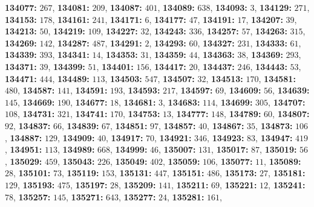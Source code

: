 \textsf{\bfseries 134077:} $267$, \textsf{\bfseries 134081:} $209$, \textsf{\bfseries 134087:} $401$, \textsf{\bfseries 134089:} $638$, \textsf{\bfseries 134093:} $3$, \textsf{\bfseries 134129:} $271$, \textsf{\bfseries 134153:} $178$, \textsf{\bfseries 134161:} $241$, \textsf{\bfseries 134171:} $6$, \textsf{\bfseries 134177:} $47$, \textsf{\bfseries 134191:} $17$, \textsf{\bfseries 134207:} $39$, \textsf{\bfseries 134213:} $50$, \textsf{\bfseries 134219:} $109$, \textsf{\bfseries 134227:} $32$, \textsf{\bfseries 134243:} $336$, \textsf{\bfseries 134257:} $57$, \textsf{\bfseries 134263:} $315$, \textsf{\bfseries 134269:} $142$, \textsf{\bfseries 134287:} $487$, \textsf{\bfseries 134291:} $2$, \textsf{\bfseries 134293:} $60$, \textsf{\bfseries 134327:} $231$, \textsf{\bfseries 134333:} $61$, \textsf{\bfseries 134339:} $393$, \textsf{\bfseries 134341:} $14$, \textsf{\bfseries 134353:} $31$, \textsf{\bfseries 134359:} $44$, \textsf{\bfseries 134363:} $38$, \textsf{\bfseries 134369:} $293$, \textsf{\bfseries 134371:} $39$, \textsf{\bfseries 134399:} $51$, \textsf{\bfseries 134401:} $156$, \textsf{\bfseries 134417:} $20$, \textsf{\bfseries 134437:} $246$, \textsf{\bfseries 134443:} $53$, \textsf{\bfseries 134471:} $444$, \textsf{\bfseries 134489:} $113$, \textsf{\bfseries 134503:} $547$, \textsf{\bfseries 134507:} $32$, \textsf{\bfseries 134513:} $170$, \textsf{\bfseries 134581:} $480$, \textsf{\bfseries 134587:} $141$, \textsf{\bfseries 134591:} $193$, \textsf{\bfseries 134593:} $217$, \textsf{\bfseries 134597:} $69$, \textsf{\bfseries 134609:} $56$, \textsf{\bfseries 134639:} $145$, \textsf{\bfseries 134669:} $190$, \textsf{\bfseries 134677:} $18$, \textsf{\bfseries 134681:} $3$, \textsf{\bfseries 134683:} $114$, \textsf{\bfseries 134699:} $305$, \textsf{\bfseries 134707:} $108$, \textsf{\bfseries 134731:} $321$, \textsf{\bfseries 134741:} $170$, \textsf{\bfseries 134753:} $13$, \textsf{\bfseries 134777:} $148$, \textsf{\bfseries 134789:} $60$, \textsf{\bfseries 134807:} $92$, \textsf{\bfseries 134837:} $66$, \textsf{\bfseries 134839:} $67$, \textsf{\bfseries 134851:} $97$, \textsf{\bfseries 134857:} $40$, \textsf{\bfseries 134867:} $35$, \textsf{\bfseries 134873:} $106$, \textsf{\bfseries 134887:} $129$, \textsf{\bfseries 134909:} $40$, \textsf{\bfseries 134917:} $70$, \textsf{\bfseries 134921:} $346$, \textsf{\bfseries 134923:} $83$, \textsf{\bfseries 134947:} $419$, \textsf{\bfseries 134951:} $113$, \textsf{\bfseries 134989:} $668$, \textsf{\bfseries 134999:} $46$, \textsf{\bfseries 135007:} $131$, \textsf{\bfseries 135017:} $87$, \textsf{\bfseries 135019:} $56$, \textsf{\bfseries 135029:} $459$, \textsf{\bfseries 135043:} $226$, \textsf{\bfseries 135049:} $402$, \textsf{\bfseries 135059:} $106$, \textsf{\bfseries 135077:} $11$, \textsf{\bfseries 135089:} $28$, \textsf{\bfseries 135101:} $73$, \textsf{\bfseries 135119:} $153$, \textsf{\bfseries 135131:} $447$, \textsf{\bfseries 135151:} $486$, \textsf{\bfseries 135173:} $27$, \textsf{\bfseries 135181:} $129$, \textsf{\bfseries 135193:} $475$, \textsf{\bfseries 135197:} $28$, \textsf{\bfseries 135209:} $141$, \textsf{\bfseries 135211:} $69$, \textsf{\bfseries 135221:} $12$, \textsf{\bfseries 135241:} $78$, \textsf{\bfseries 135257:} $145$, \textsf{\bfseries 135271:} $643$, \textsf{\bfseries 135277:} $24$, \textsf{\bfseries 135281:} $161$, 
